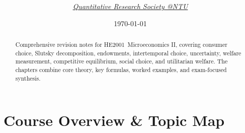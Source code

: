 \documentclass[12pt]{article}
\title{
\Huge \CourseCode\ \CourseName \\[0.3em]
\Large \AcademicYear
}
\author{
  \textit{\href{https://qrsntu.org}{Quantitative Research Society @NTU}}
}
\date{\today}
\newcommand{\CourseCode}{HE2001}
\newcommand{\CourseName}{Microeconomics II}
\begin{document}
\maketitle
\thispagestyle{plainfirst}

\begin{abstract}
\noindent
Comprehensive revision notes for \CourseCode\ \CourseName, covering consumer choice, Slutsky decomposition, endowments, intertemporal choice, uncertainty, welfare measurement, competitive equilibrium, social choice, and utilitarian welfare. The chapters combine core theory, key formulas, worked examples, and exam-focused synthesis.
\end{abstract}

\vspace{0.5cm}
\tableofcontents
\newpage

\fontsize{10.5pt}{11.5pt}\selectfont
\pagestyle{main}

\section*{Course Overview \& Topic Map}
\end{document}
